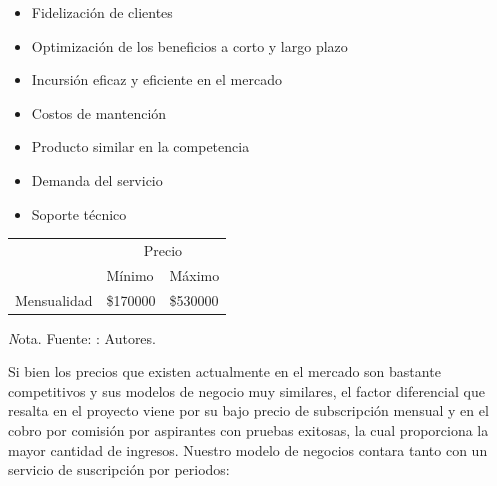 \begin{itemize}
    \item Fidelización de clientes
    \item Optimización de los beneficios a corto y largo plazo
    \item Incursión eficaz y eficiente en el mercado
    \item Costos de mantención
    \item Producto similar en la competencia
    \item Demanda del servicio
    \item Soporte técnico
\end{itemize}
\begin{adjustbox}{
            center,
            caption=[{Precio en el mercado actual}]{\centering Precio en el mercado actual (Valores en pesos colombianos COP). },
            label={Precio},
            nofloat=table, vspace={20px}}
            {
            \begin{threeparttable}
           \begin{tabular}{|p{11cm}|p{10cm}p{2cm}|}
                \hline
                \rowcolor[HTML]{D9EAD3} 
                \cellcolor[HTML]{D9EAD3}                              & \multicolumn{2}{c|}{\cellcolor[HTML]{D9EAD3}Precio}            \\ \cline{2-3} 
                \rowcolor[HTML]{D9EAD3} 
                \multirow{-2}{*}{\cellcolor[HTML]{D9EAD3}Suscripción} & \multicolumn{1}{l|}{\cellcolor[HTML]{D9EAD3}Mínimo} & Máximo   \\ \hline
                \multicolumn{1}{|l|}{Mensualidad}                     & \multicolumn{1}{l|}{\$170000}                       & \$530000 \\ \hline
            \end{tabular}
            \begin{tablenotes}
                \vspace{2mm}
               \textit Nota. Fuente: : Autores.
            \end{tablenotes}
            
        \end{threeparttable} 
    }        
            
\end{adjustbox}

Si bien los precios que existen actualmente en el mercado son bastante competitivos y sus modelos de negocio muy similares, el factor diferencial que resalta en el proyecto viene por su bajo precio de subscripción mensual y en el cobro por comisión por aspirantes con pruebas exitosas, la cual proporciona la mayor cantidad de ingresos. Nuestro modelo de negocios contara tanto con un servicio de suscripción por periodos:


